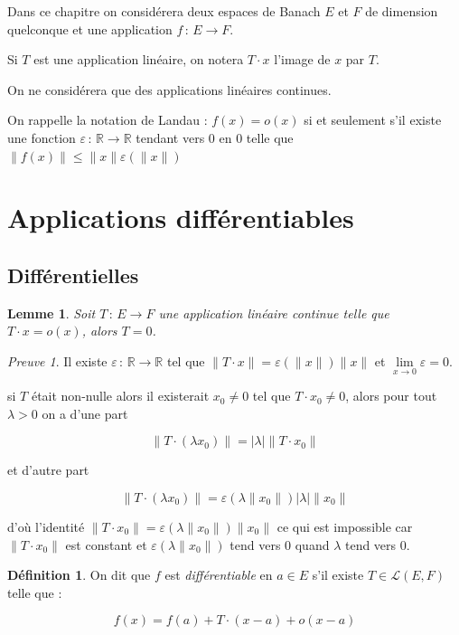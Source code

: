 \documentclass[]{article}
\newtheorem{mylemma}{Lemme}
\theoremstyle{remark}
\newtheorem{myproof}{Preuve}
\theoremstyle{definition}
\newtheorem{mydef}{Définition}
\newcommand{\funcshort}[3]{
#1 \, : \, #2 \longrightarrow #3
}
\begin{document}
Dans ce chapitre on considérera deux espaces de Banach $E$ et $F$ de dimension quelconque et une application $\funcshort{f}{E}{F}$.

Si $T$ est une application linéaire, on notera $T \cdot x$ l'image de $x$ par $T$.

On ne considérera que des applications linéaires continues.

On rappelle la notation de Landau : $f(x)=o(x)$ si et seulement s'il existe une fonction $\funcshort{\varepsilon}{\mathbb{R}}{\mathbb{R}}$ tendant vers 0 en 0 telle que $\|f(x)\| \leqslant \|x\| \varepsilon(\|x\|)$

\section{Applications différentiables}

\subsection{Différentielles}

\begin{mylemma}
	Soit $\funcshort{T}{E}{F}$ une application linéaire continue telle que $T \cdot x = o(x)$, alors $T = 0$. 
\end{mylemma}

\begin{myproof}
	Il existe $\funcshort{\varepsilon}{\mathbb{R}}{\mathbb{R}}$ tel que $\|T\cdot x\| = \varepsilon(\|x\|) \|x\|$ et $\lim\limits_{x \to 0} \varepsilon = 0$.
	
	si $T$ était non-nulle alors il existerait $x_0 \neq 0$ tel que $T \cdot x_0 \neq 0$, alors pour tout $\lambda > 0$ on a d'une part
	
	$$\|T \cdot (\lambda x_0)\| = |\lambda| \|T \cdot x_0\|$$
	
	et d'autre part
	
	$$\|T \cdot (\lambda x_0)\| = \varepsilon(\lambda \|x_0\|) |\lambda| \|x_0\|$$
	
	d'où l'identité $\|T \cdot x_0\| = \varepsilon(\lambda \|x_0\|) \|x_0\|$ ce qui est impossible car $\|T \cdot x_0\|$ est constant et $\varepsilon(\lambda \|x_0\|)$ tend vers 0 quand $\lambda$ tend vers 0.
\end{myproof}

\begin{mydef}
	On dit que $f$ est \textit{différentiable} en $a \in E$ s'il existe $T \in \mathcal{L}(E, F)$ telle que :
	
	$$f(x) = f(a) + T \cdot (x-a) + o(x - a)$$
\end{mydef}
\end{document}

